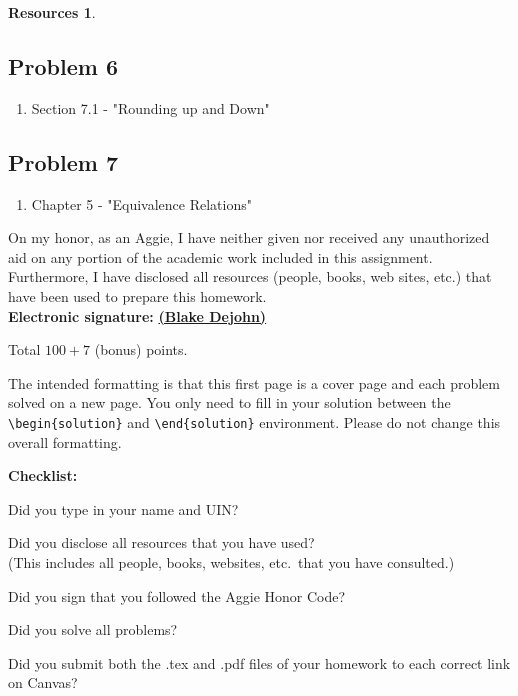 \documentclass{article}
\theoremstyle{definition}
\newtheorem*{solution}{Solution}
\newtheorem*{resources}{Resources}
\newcommand{\honor}{\noindent On my honor, as an Aggie, I have neither
  given nor received any unauthorized aid on any portion of the
  academic work included in this assignment. Furthermore, I have
  disclosed all resources (people, books, web sites, etc.) that have
  been used to prepare this homework. \\[2ex]
 \textbf{Electronic signature:} \underline{ \textbf{(Blake Dejohn)} } } %
\newcommand{\checklist}{\noindent\textbf{Checklist:}
\begin{compactitem}[$\Box$] 
\item [\checkmark]  Did you type in your name and UIN? 
\item [\checkmark] Did you disclose all resources that you have used? \\
(This includes all people, books, websites, etc.\ that you have consulted.)
\item [\checkmark] Did you sign that you followed the Aggie Honor Code? 
\item [\checkmark] Did you solve all problems? 
\item [\checkmark] Did you submit both the .tex and .pdf files of your homework to each correct link on Canvas? 
\end{compactitem}
}
\begin{document}
\begin{resources}
\subsection*{Problem 6}
\begin{enumerate}
\item Section 7.1 - "Rounding up and Down"
\end{enumerate}
\subsection*{Problem 7}
\begin{enumerate}
\item Chapter 5 - "Equivalence Relations"
\end{enumerate}
\end{resources}
\honor

\bigskip

\noindent
Total $100 + 7$ (bonus) points.

\bigskip

\noindent
The intended formatting is that this first page is a cover page and each 
problem solved on a new page. You only need to fill in your solution between 
the \verb|\begin{solution}| and \verb|\end{solution}| environment.  
Please do not change this overall formatting.

\vfill
\checklist
\end{document}
